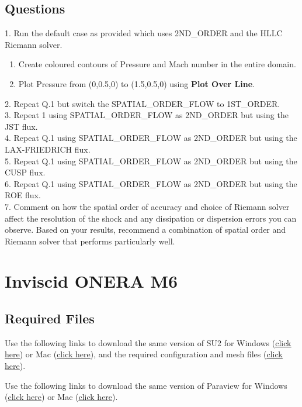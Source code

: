 \section{Questions}
1. Run the default case as provided which uses 2ND\_ORDER and the HLLC Riemann solver.
\begin{enumerate}[label=(\alph*)]
    \item Create coloured contours of Pressure and Mach number in the entire domain.
    \item Plot Pressure from (0,0.5,0) to (1.5,0.5,0) using \textbf{Plot Over Line}.
\end{enumerate}
2. Repeat Q.1 but switch the SPATIAL\_ORDER\_FLOW to 1ST\_ORDER. \\
3. Repeat 1 using SPATIAL\_ORDER\_FLOW as 2ND\_ORDER but using the JST flux. \\
4. Repeat Q.1 using SPATIAL\_ORDER\_FLOW as 2ND\_ORDER but using the LAX-FRIEDRICH flux. \\
5. Repeat Q.1 using SPATIAL\_ORDER\_FLOW as 2ND\_ORDER but using the CUSP flux. \\
6. Repeat Q.1 using SPATIAL\_ORDER\_FLOW as 2ND\_ORDER but using the ROE flux. \\
7. Comment on how the spatial order of accuracy and choice of Riemann solver affect the resolution of the shock and any dissipation or dispersion errors you can observe. Based on your results, recommend a combination of spatial order and Riemann solver that performs particularly well.
\chapter{Inviscid ONERA M6}
\label{ch:Inviscid ONERA M6}
\section{Required Files}
\begin{su2note}
	Use the following links to download the same version of SU2 for Windows (\href{https://users.encs.concordia.ca/~bvermeir/book/executables/windows/SU2_Windows.zip}{\underline{click here}}) or Mac (\href{https://users.encs.concordia.ca/~bvermeir/book/executables/osx/SU2_Mac.zip}{\underline{click here}}), and the required configuration and mesh files (\href{https://gitlab.com/bvermeir/book-cfd/blob/master/tutorial/tut3_invisicd_oneram6/oneram6_inviscid.zip}{\underline{click here}}).
\end{su2note}
\begin{paraviewnote}
	Use the following links to download the same version of Paraview for Windows (\href{https://users.encs.concordia.ca/~bvermeir/book/executables/windows/ParaView-5.4.0-Qt5-OpenGL2-Windows-64bit.exe}{\underline{click here}}) or Mac (\href{https://users.encs.concordia.ca/~bvermeir/book/executables/osx/ParaView-5.4.0-Qt5-OpenGL2-MPI-OSX10.8-64bit.dmg}{\underline{click here}}).
\end{paraviewnote}

